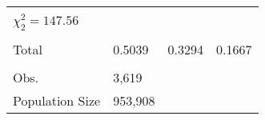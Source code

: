 \begin{table}[h]
\begin{tabular}{@{}llll@{}}
                                       &          &            &            \\
$\chi^2_2 = 147.56$                    &          &            &            \\
                                       &          &            &            \\
Total                                  & 0.5039   & 0.3294     & 0.1667     \\
                                       &          &            &            \\
Obs.                                   & 3,619    &            &            \\
Population Size                        & 953,908  &            &            \\ \bottomrule
\end{tabular}
\end{table}